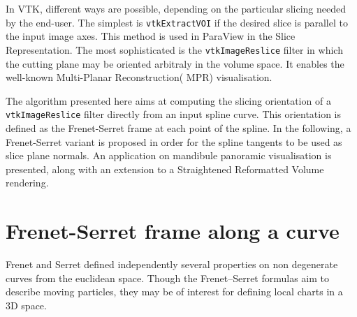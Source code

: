\documentclass{InsightArticle}
\begin{document}
In VTK, different ways are possible, depending on the particular slicing needed
by the end-user. The simplest is \verb|vtkExtractVOI| if the desired slice is
parallel to the input image axes. This method is used in ParaView in the Slice
Representation. The most sophisticated is the \verb|vtkImageReslice| filter in
which the cutting plane may be oriented arbitraly in the volume space. It
enables the well-known Multi-Planar Reconstruction( MPR) visualisation.

The algorithm presented here aims at computing the slicing orientation of a
\verb|vtkImageReslice| filter directly from an input spline curve. This
orientation is defined as the Frenet-Serret frame at each point of the spline.
In the following, a Frenet-Serret variant is proposed in order for the spline
tangents to be used as slice plane normals. An application on mandibule
panoramic visualisation is presented, along with an extension to a Straightened
Reformatted Volume rendering.
%
\section{Frenet-Serret frame along a curve}
Frenet \cite{FRE52} and Serret \cite{SER51} defined independently several
properties on non degenerate curves from the euclidean space. Though the 
Frenet--Serret formulas aim to describe moving particles, they may be of
interest for defining local charts in a 3D space. 
%
\end{document}

